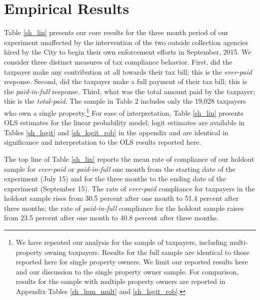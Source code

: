 \documentclass[12pt]{article}
\begin{document}
\section{Empirical Results}

Table \ref{sh_lin} presents our core results for the three month
period of our experiment unaffected by the intervention of the
two outside collection agencies hired by the City to begin their own
enforcement efforts in September, 2015. We consider three distinct
measures of tax compliance behavior. First, did the taxpayer make any
contribution at all towards their tax bill; this is the
\textit{ever-paid} response. Second, did the taxpayer make a full
payment of their tax bill; this is the \textit{paid-in-full}
response. Third, what was the total amount paid by the taxpayer; this is the \textit{total-paid}.
 The sample in Table 2  includes only the 19,028 taxpayers
who own a single property.\footnote{We have repeated our analysis for
  the sample of taxpayers, including multi-property owning
  taxpayers. Results for the full sample are identical to those
  reported here for single property owners. We limit our reported
  results here and our discussion to the single property owner sample. For
  comparison, results for the sample with multiple property owners are
  reported in Appendix Tables \ref{sh_lpm_mult} and
  \ref{sh_logit_rob}.} For ease of interpretation, Table \ref{sh_lin}
presents OLS estimates for the linear probability model; logit
estimates are available in Tables \ref{sh_logit} and
\ref{sh_logit_rob} in the appendix and are identical in significance
and interpretation to the OLS results reported here.

The top line of Table \ref{sh_lin} reports the mean rate of compliance
of our holdout sample for \textit{ever-paid} or \textit{paid-in-full}
one month from the starting date of the experiment (July 15) and for
the three months to the ending date of the experiment (September
15). The rate of \textit{ever-paid} compliance for taxpayers in the
holdout sample rises from 30.5 percent after one month to 51.4 percent
after three months; the rate of \textit{paid-in-full} compliance for
the holdout sample raises from 23.5 percent after one month to 40.8
percent after three months.
\end{document}
